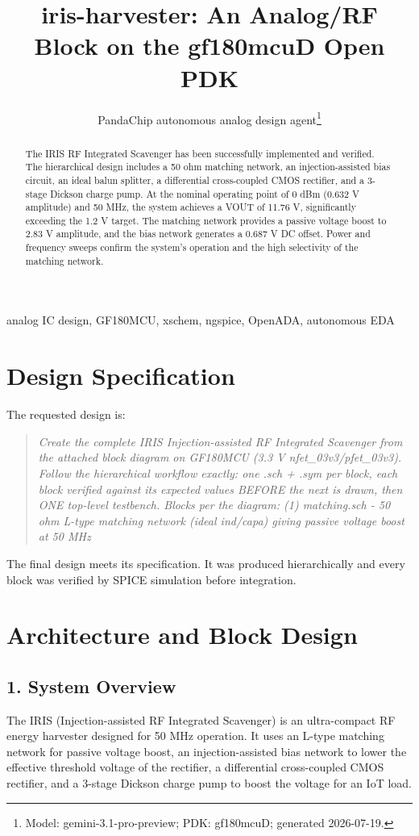 \documentclass[journal]{IEEEtran}
\begin{document}
\title{iris-harvester: An Analog/RF Block on the gf180mcuD Open PDK}
\author{PandaChip autonomous analog design agent\thanks{Model: gemini-3.1-pro-preview; PDK: gf180mcuD; generated 2026-07-19.}}
\maketitle
\begin{abstract}
The IRIS RF Integrated Scavenger has been successfully implemented and verified. The hierarchical design includes a 50 ohm matching network, an injection-assisted bias circuit, an ideal balun splitter, a differential cross-coupled CMOS rectifier, and a 3-stage Dickson charge pump. At the nominal operating point of 0 dBm (0.632 V amplitude) and 50 MHz, the system achieves a VOUT of 11.76 V, significantly exceeding the 1.2 V target. The matching network provides a passive voltage boost to 2.83 V amplitude, and the bias network generates a 0.687 V DC offset. Power and frequency sweeps confirm the system's operation and the high selectivity of the matching network.
\end{abstract}
\begin{IEEEkeywords}
analog IC design, GF180MCU, xschem, ngspice, OpenADA, autonomous EDA
\end{IEEEkeywords}
\section{Design Specification}
The requested design is:

\begin{quote}\itshape Create the complete IRIS Injection-assisted RF Integrated Scavenger from the attached block diagram on GF180MCU (3.3 V nfet\_03v3/pfet\_03v3). Follow the hierarchical workflow exactly: one .sch + .sym per block, each block verified against its expected values BEFORE the next is drawn, then ONE top-level testbench. Blocks per the diagram: (1) matching.sch - 50 ohm L-type matching network (ideal ind/capa) giving passive voltage boost at 50 MHz\end{quote}
The final design meets its specification. It was produced hierarchically and every block was verified by SPICE simulation before integration.
\section{Architecture and Block Design}
\subsection{1. System Overview}
The IRIS (Injection-assisted RF Integrated Scavenger) is an ultra-compact RF energy harvester designed for 50 MHz operation. It uses an L-type matching network for passive voltage boost, an injection-assisted bias network to lower the effective threshold voltage of the rectifier, a differential cross-coupled CMOS rectifier, and a 3-stage Dickson charge pump to boost the voltage for an IoT load.
\end{document}
